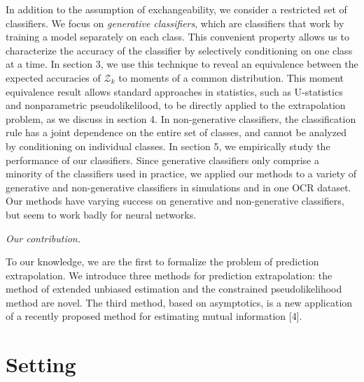 \documentclass[12pt]{article}
\begin{document}
In addition to the assumption of exchangeability, we consider a restricted set of classifiers.
We focus on \emph{generative classifiers}, which are classifiers that work by training
a model separately on each class.  This convenient property 
allows us to characterize the accuracy of the classifier by selectively conditioning on one class at a time.
In section 3, we use this technique to reveal an equivalence between 
the expected accuracies of $\mathcal{Z}_k$ to moments of a common distribution.
This moment equivalence result allows standard approaches in statistics, such as U-statistics and
nonparametric pseudolikelilood, to be directly applied to the extrapolation problem, as we discuss in section 4.
In non-generative classifiers, the classification rule has a joint dependence on the entire set of classes,
and cannot be analyzed by conditioning on individual classes.
In section 5, we empirically study the performance of our classifiers.
Since generative classifiers only comprise a minority of the classifiers used in practice,
we applied our methods to a variety of generative and non-generative classifiers
in simulations and in one OCR dataset.  Our methods have varying success on generative and non-generative classifiers,
but seem to work badly for neural networks.

\noindent\emph{Our contribution.}

To our knowledge, we are the first to formalize the problem of prediction extrapolation.
We introduce three methods for prediction extrapolation: the method of extended unbiased estimation
and the constrained pseudolikelihood method are novel.  The third method, based
on asymptotics, is a new application of a recently proposed method 
for estimating mutual information [4].

\section{Setting}
\end{document}
